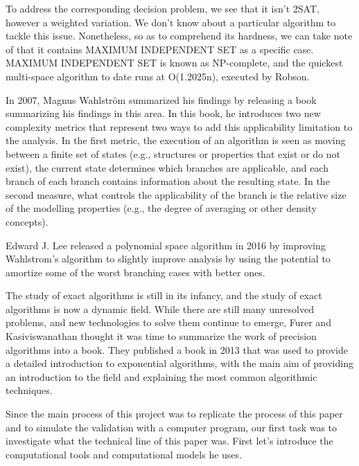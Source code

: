 \documentclass{sigchi}
\begin{document}
To address the corresponding decision problem, we see that it isn't 2SAT, however a weighted variation. We don't know about a particular algorithm to tackle this issue. Nonetheless, so as to comprehend its hardness, we can take note of that it contains MAXIMUM INDEPENDENT SET as a specific case. MAXIMUM INDEPENDENT SET is known as NP-complete, and the quickest multi-space algorithm to date runs at O(1.2025n), executed by Robson.\cite{robson2001finding}

In 2007, Magnus Wahlström summarized his findings by releasing a book summarizing his findings in this area.\cite{Wahlstrom} In this book, he introduces two new complexity metrics that represent two ways to add this applicability limitation to the analysis. In the first metric, the execution of an algorithm is seen as moving between a finite set of states (e.g., structures or properties that exist or do not exist), the current state determines which branches are applicable, and each branch of each branch contains information about the resulting state. In the second measure, what controls the applicability of the branch is the relative size of the modelling properties (e.g., the degree of averaging or other density concepts).

Edward J. Lee released a polynomial space algorithm in 2016 by improving Wahlstrom's algorithm to slightly improve analysis by using the potential to amortize some of the worst branching cases with better ones. \cite{Lee}

The study of exact algorithms is still in its infancy, and the study of exact algorithms is now a dynamic field. While there are still many unresolved problems, and new technologies to solve them continue to emerge, Furer and Kasiviswanathan thought it was time to summarize the work of precision algorithms into a book. They published a book in 2013 that was used to provide a detailed introduction to exponential algorithms, with the main aim of providing an introduction to the field and explaining the most common algorithmic techniques.\cite{10.1145/2428556.2428575}

Since the main process of this project was to replicate the process of this paper and to simulate the validation with a computer program, our first task was to investigate what the technical line of this paper was. First let's introduce the computational tools and computational models he uses.
\end{document}
